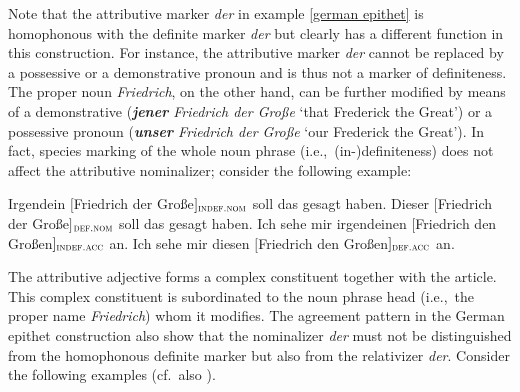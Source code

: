 Note that the attributive marker \textit{der} in example \ref{german epithet} is homophonous with the definite marker \textit{der} but clearly has a different function in this construction. For instance, the attributive marker \textit{der} cannot be replaced by a possessive or a demonstrative pronoun and is thus not a marker of definiteness. The proper noun \textit{Friedrich}, on the other hand, can be further modified by means of a demonstrative (\textit{\textbf{jener} Friedrich der Große} ‘that Frederick the Great’) or a possessive pronoun (\textit{\textbf{unser} Friedrich der Große} ‘our Frederick the Great’). In fact, species marking of the whole noun phrase (i.e.,~(in-)definiteness) does not affect the attributive nominalizer; consider the following example:
\begin{exe}
\ex
{}
\begin{xlist}
\ex	Irgendein $[$Friedrich der Große$]_{\textsc{indef.nom}}$ soll das gesagt haben.
\ex	Dieser $[$Friedrich der Große$]$$_{\textsc{def.nom}}$ soll das gesagt haben. 
\ex	Ich sehe mir irgendeinen $[$Friedrich den Großen$]_{\textsc{indef.acc}}$ an.
\ex	Ich sehe mir diesen $[$Friedrich den Großen$]_{\textsc{def.acc}}$ an.
\end{xlist}
\end{exe}
The attributive adjective forms a complex constituent together with the article. This complex constituent is subordinated to the noun phrase head (i.e.,~the proper name \textit{Friedrich}) whom it modifies. The agreement pattern in the German epithet construction also show that the nominalizer \textit{der} must not be distinguished from the homophonous definite marker but also from the relativizer \textit{der}. Consider the following examples (cf.~also \citealt[181]{himmelmann1997}).
\begin{exe}
\ex \label{article versus rel}
\begin{xlist}
\end{xlist}
\end{exe}
